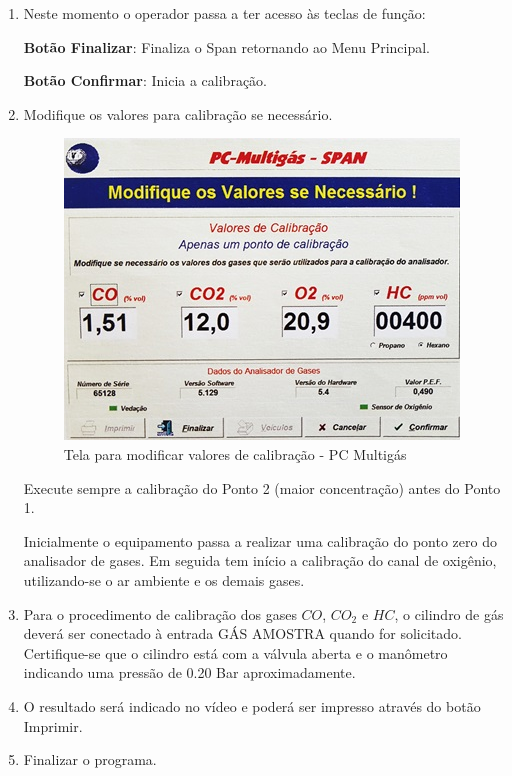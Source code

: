\begin{enumerate}
	\item Neste momento o operador passa a ter acesso às teclas de função:

	\textbf{Botão Finalizar}: Finaliza o Span retornando ao Menu Principal.

	\textbf{Botão Confirmar}: Inicia a calibração.

	\item Modifique os valores para calibração se necessário.

	\begin{figure}[h!]
		\centering
		\includegraphics[keepaspectratio=true,scale= 1.0]{figuras/PLANO3.jpg}
		\caption{Tela para modificar valores de calibração - PC Multigás}
		\label{metodoCalibracao}
	\end{figure}

	Execute sempre a calibração do Ponto 2 (maior concentração) antes do Ponto 1.

	Inicialmente o equipamento passa a realizar uma calibração do ponto zero do analisador de gases. Em seguida tem início a calibração do canal de oxigênio, utilizando-se o ar ambiente e os demais gases.

	\item Para o procedimento de calibração dos gases $CO$, $CO_{2}$ e $HC$, o cilindro de gás deverá ser conectado à entrada GÁS AMOSTRA quando for solicitado. Certifique-se que o cilindro está com a válvula aberta e o manômetro indicando uma pressão de 0.20 Bar aproximadamente.


	\item O resultado será indicado no vídeo e poderá ser impresso através do botão Imprimir.

	\item Finalizar o programa.

\end{enumerate}

